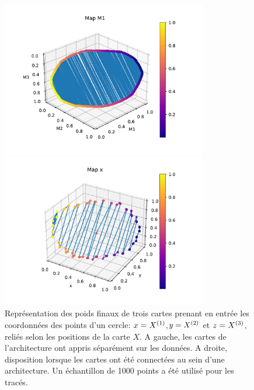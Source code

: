 {\begin{figure}
\begin{minipage}{0.5\textwidth}
\centering\includegraphics[width=0.8\textwidth]{unco3som}
\end{minipage}
\begin{minipage}{0.5\textwidth}
\centering\includegraphics[width=0.8\textwidth]{disto_Mx}
\end{minipage}
\caption{Représentation des poids finaux de trois cartes prenant en entrée les coordonnées des points d'un cercle: $x = X^{({1})}$,$y = X^{({2})}$ et $z=X^{({3})}$, reliés selon les positions de la carte $X$. A gauche, les cartes de l'architecture ont appris séparément sur les données. A droite, disposition lorsque les cartes ont été connectées au sein d'une architecture. Un échantillon de 1000 points a été utilisé pour les tracés.}
\label{fig:distortion}
\end{figure}

}
